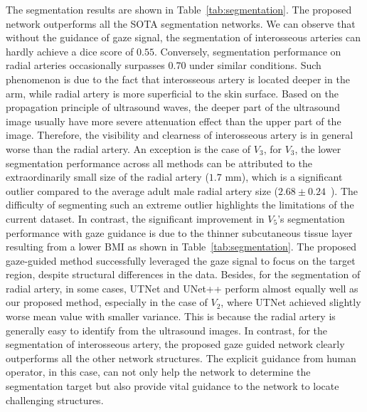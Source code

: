 \par
The segmentation results are shown in Table~\ref{tab:segmentation}. The proposed network outperforms all the SOTA segmentation networks.
We can observe that without the guidance of gaze signal, the segmentation of interosseous arteries can hardly achieve a dice score of $0.55$. Conversely, segmentation performance on radial arteries occasionally surpasses 0.70 under similar conditions.
Such phenomenon is due to the fact that interosseous artery is located deeper in the arm, while radial artery is more superficial to the skin surface. Based on the propagation principle of ultrasound waves, the deeper part of the ultrasound image usually have more severe attenuation effect than the upper part of the image. Therefore, the visibility and clearness of interosseous artery is in general worse than the radial artery. 
An exception is the case of $V_3$, for $V_3$, the lower segmentation performance across all methods can be attributed to the extraordinarily small size of the radial artery ($1.7$ mm), which is a significant outlier compared to the average adult male radial artery size ($2.68\pm0.24$~\cite{wahood2022radial}). The difficulty of segmenting such an extreme outlier highlights the limitations of the current dataset. In contrast, the significant improvement in $V_5$'s segmentation performance with gaze guidance is due to the thinner subcutaneous tissue layer resulting from a lower BMI as shown in Table~\ref{tab:segmentation}. The proposed gaze-guided method successfully leveraged the gaze signal to focus on the target region, despite structural differences in the data.
Besides, for the segmentation of radial artery, in some cases, UTNet and UNet++ perform almost equally well as our proposed method, especially in the case of $V_2$, where UTNet achieved slightly worse mean value with smaller variance. This is because the radial artery is generally easy to identify from the ultrasound images. 
In contrast, for the segmentation of interosseous artery, the proposed gaze guided network clearly outperforms all the other network structures. The explicit guidance from human operator, in this case, can not only help the network to determine the segmentation target but also provide vital guidance to the network to locate challenging structures. 


